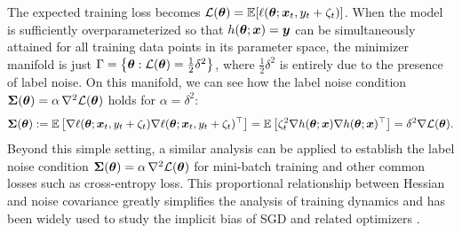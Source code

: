 The expected training loss becomes $\mathcal{L}({\bm{\theta}}) = \mathbb{E}[\ell({\bm{\theta}}; {\bm{x}}_t, y_t + \zeta_t)]$. When the model is sufficiently overparameterized so that $h({\bm{\theta}}; {\bm{x}}) = {\bm{y}}$ can be simultaneously attained for all training data points in its parameter space, the minimizer manifold is just $\Gamma = \left\{{\bm{\theta}}: \mathcal{L}({\bm{\theta}}) = \frac{1}{2}\delta^2 \right\}$, where $\frac{1}{2}\delta^2$ is entirely due to the presence of label noise. On this manifold, we can see how the label noise condition ${\bm{\Sigma}}({\bm{\theta}})=\alpha\,\nabla^2\mathcal{L}({\bm{\theta}})$ holds for $\alpha = \delta^2$:
\begin{align*}
    {\bm{\Sigma}}({\bm{\theta}}) := \mathbb{E}\left[\nabla\ell({\bm{\theta}}; {\bm{x}}_t, y_t + \zeta_t) \nabla\ell({\bm{\theta}}; {\bm{x}}_t, y_t + \zeta_t)^\top\right] = \mathbb{E}\left[ \zeta_t^2 \nabla h({\bm{\theta}}; {\bm{x}}) \nabla h({\bm{\theta}}; {\bm{x}})^\top \right] = \delta^2 \nabla \mathcal{L}({\bm{\theta}}).
\end{align*}
Beyond this simple setting, a similar analysis can be applied to establish the label noise condition
${\bm{\Sigma}}({\bm{\theta}})=\alpha\,\nabla^2\mathcal{L}({\bm{\theta}})$
for mini-batch training and other common losses such as cross-entropy loss. This proportional relationship between Hessian and noise covariance greatly simplifies the analysis of training dynamics and
has been widely used to study 
the implicit bias of SGD and related optimizers \citep{blanc2020implicit,damian2021label,li2021happens,gu2023and}.

